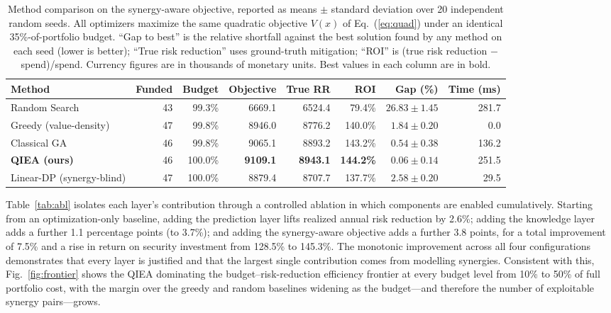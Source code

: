 \documentclass[preprint,12pt]{elsarticle}
\begin{document}
\begin{table}[htbp]
\centering
\caption{Method comparison on the synergy-aware objective, reported as means $\pm$
standard deviation over 20 independent random seeds. All optimizers maximize the same
quadratic objective $V(x)$ of Eq.~(\ref{eq:quad}) under an identical 35\%-of-portfolio
budget. ``Gap to best'' is the relative shortfall against the best solution found by any
method on each seed (lower is better); ``True risk reduction'' uses ground-truth
mitigation; ``ROI'' is (true risk reduction $-$ spend)/spend. Currency figures are in
thousands of monetary units. Best values in each column are in bold.}
\label{tab:perf}
\small
\begin{tabular}{lrrrrrrr}
\toprule
Method & Funded & Budget & Objective & True RR & ROI & Gap (\%) & Time (ms) \\
\midrule
Random Search            & 43 & 99.3\%  & 6669.1 & 6524.4 & 79.4\%  & $26.83 \pm 1.45$ & 281.7 \\
Greedy (value-density)   & 47 & 99.8\%  & 8946.0 & 8776.2 & 140.0\% & $1.84 \pm 0.20$ & 0.0 \\
Classical GA             & 46 & 99.8\%  & 9065.1 & 8893.2 & 143.2\% & $0.54 \pm 0.38$ & 136.2 \\
\textbf{QIEA (ours)}     & 46 & 100.0\% & \textbf{9109.1} & \textbf{8943.1} & \textbf{144.2\%} & $\mathbf{0.06 \pm 0.14}$ & 251.5 \\
Linear-DP (synergy-blind)& 47 & 100.0\% & 8879.4 & 8707.7 & 137.7\% & $2.58 \pm 0.20$ & 29.5 \\
\bottomrule
\end{tabular}
\end{table}

Table~\ref{tab:abl} isolates each layer's contribution through a controlled ablation in
which components are enabled cumulatively. Starting from an optimization-only baseline,
adding the prediction layer lifts realized annual risk reduction by 2.6\%; adding the
knowledge layer adds a further 1.1 percentage points (to 3.7\%); and adding the
synergy-aware objective adds a further 3.8 points, for a total improvement of 7.5\% and a
rise in return on security investment from 128.5\% to 145.3\%. The monotonic improvement
across all four configurations demonstrates that every layer is justified and that the
largest single contribution comes from modelling synergies. Consistent with this,
Fig.~\ref{fig:frontier} shows the QIEA dominating the budget--risk-reduction efficiency
frontier at every budget level from 10\% to 50\% of full portfolio cost, with the margin
over the greedy and random baselines widening as the budget---and therefore the number of
exploitable synergy pairs---grows.
\end{document}
